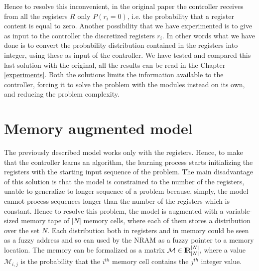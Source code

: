 Hence to resolve this inconvenient, in the original paper the controller receives from all the registers $R$ only $P(r_{i} = 0)$, i.e. the probability that a register content is equal to zero. Another possibility that we have experimented is to give as input to the controller the discretized registers $r_{i}$. In other words what we have done is to convert the probability distribution contained in the registers into integer, using these as input of the controller. We have tested and compared this last solution with the original, all the results can be read in the Chapter \ref{experiments}. Both the solutions limits the information available to the controller, forcing it to solve the problem with the modules instead on its own, and reducing the problem complexity.

\section{Memory augmented model}\label{sec:nram-memory}
The previously described model works only with the registers. Hence, to make that the controller learns an algorithm, the learning process starts initializing the registers with the starting input sequence of the problem. The main disadvantage of this solution is that the model is constrained to the number of the registers, unable to generalize to longer sequence of a problem because, simply, the model cannot process sequences longer than the number of the registers which is constant.\newline\newline
Hence to resolve this problem, the model is augmented with a variable-sized memory tape of $|N|$ memory cells, where each of them stores a distribution over the set $N$. Each distribution both in registers and in memory could be seen as a fuzzy address and so can used by the NRAM as a fuzzy pointer to a memory location. The memory can be formalized as a matrix $\mathcal{M} \in \textrm{I\!R}_{|N|}^{|N|}$, where a value $\mathcal{M}_{i,j}$ is the probability that the $i^{th}$ memory cell contains the $j^{th}$ integer value.

